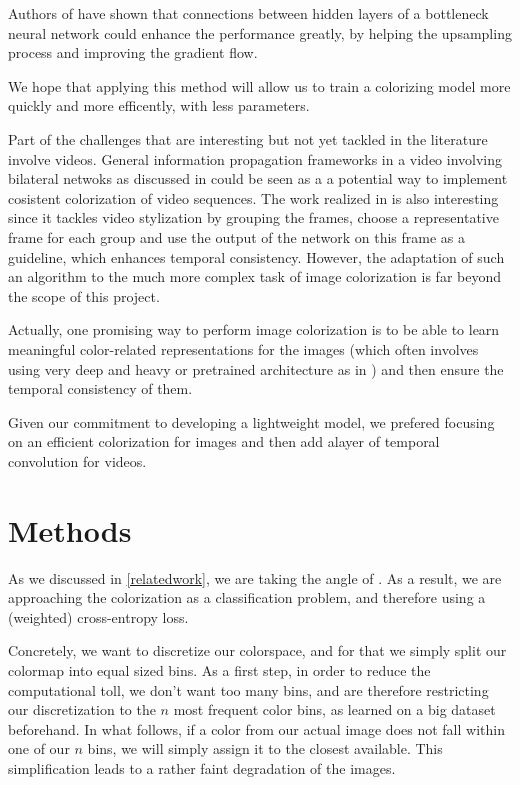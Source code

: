 \documentclass[10pt,twocolumn,letterpaper]{article}
\begin{document}
Authors of \cite{ronneberger2015unet} have shown that connections between hidden layers of a bottleneck neural network could enhance the performance greatly, by helping the upsampling process and improving the gradient flow. 

We hope that applying this method will allow us to train a colorizing model more quickly and more efficently, with less parameters. 

Part of the challenges that are interesting but not yet tackled in the literature involve videos. General information propagation frameworks in a video involving bilateral netwoks as discussed in \cite{jampani2017video} could be seen as a a potential way to implement cosistent colorization of video sequences. The work realized in \cite{zhu2017video} is also interesting since it tackles video stylization by grouping the frames, choose a representative frame for each group and use the output of the network on this frame as a guideline, which enhances temporal consistency. However, the adaptation of such an algorithm to the much more complex task of image colorization is far beyond the scope of this project. 

Actually, one promising way to perform image colorization is to be able to learn meaningful color-related representations for the images (which often involves using very deep and heavy or pretrained architecture as in \cite{larsson2016repres}) and then ensure the temporal consistency of them. 

Given our commitment to developing a lightweight model, we prefered focusing on an efficient colorization for images and then add alayer of temporal convolution for videos. 


\section{Methods}

As we discussed in \ref{relatedwork}, we are taking the angle of \cite{zhang2016colorful}. As a result, we are approaching the colorization as a classification problem, and therefore using a (weighted) cross-entropy loss.

Concretely, we want to discretize our colorspace, and for that we simply split our colormap into equal sized bins. As a first step, in order to reduce the computational toll, we don't want too many bins, and are therefore restricting our discretization to the $n$ most frequent color bins, as learned on a big dataset beforehand. In what follows, if a color from our actual image does not fall within one of our $n$ bins, we will simply assign it to the closest available. This simplification leads to a rather faint degradation of the images.
\end{document}
